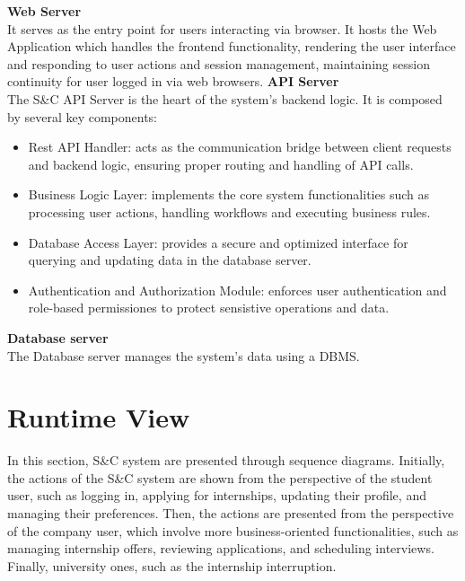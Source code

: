 \textbf{Web Server} \\
It serves as the entry point for users interacting via browser. It hosts the Web Application which handles the frontend functionality, rendering the user interface and responding to user actions and session management, maintaining session continuity for user logged in via web browsers.
\textbf{API Server} \\
The S\&C API Server is the heart of the system's backend logic. It is composed by several key components:
\begin{itemize}
    \item Rest API Handler: acts as the communication bridge between client requests and backend logic, ensuring proper routing and handling of API calls.
    \item Business Logic Layer: implements the core system functionalities such as processing user actions, handling workflows and executing business rules.
    \item Database Access Layer: provides a secure and optimized interface for querying and updating data in the database server.
    \item Authentication and Authorization Module: enforces user authentication and role-based permissiones to protect sensistive operations and data.
\end{itemize}

\textbf{Database server} \\
The Database server manages the system's data using a DBMS.

\section{Runtime View}
\label{sec:runtime_view}
In this section, S\&C system are presented through sequence diagrams. Initially, the actions of the S\&C system are shown from the perspective of the student user, such as logging in, applying for internships, updating their profile, and managing their preferences. Then, the actions are presented from the perspective of the company user, which involve more business-oriented functionalities, such as managing internship offers, reviewing applications, and scheduling interviews. Finally, university ones, such as the internship interruption.

\setcounter{uc}{1}
\newcommand{\cuc}{\theuc\stepcounter{uc}}

